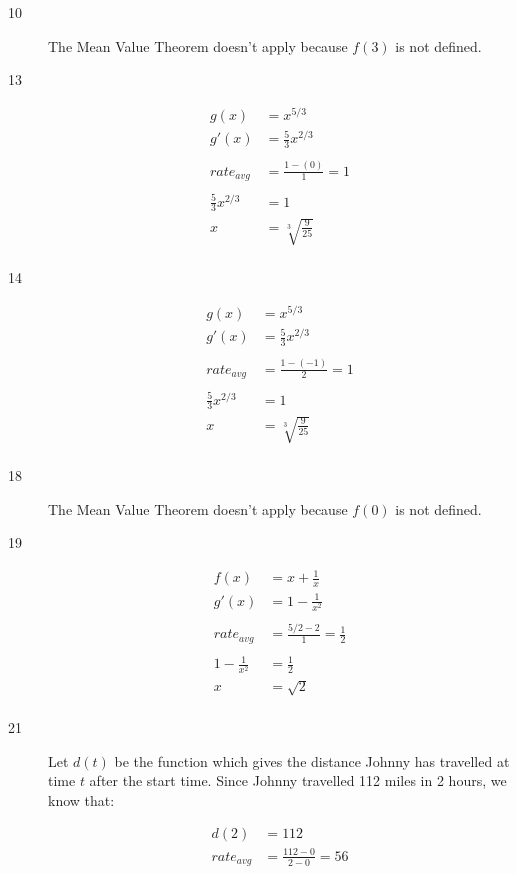 \documentclass[fleqn]{exam}
\begin{document}
\begin{description}
\item[10]
The Mean Value Theorem doesn't apply because $f(3)$ is not defined.

\item[13]
\begin{align*}
  g(x) &= x^{5/3} \\
  g'(x) &= \frac{5}{3} x^{2/3} \\
\\
  rate_{avg} &= \frac{1 - (0)}{1} = 1 \\
\\
  \frac{5}{3} x^{2/3} &= 1 \\
  x &= \sqrt[3] { \frac{9}{25} } \\
\end{align*}
 
\item[14]
\begin{align*}
  g(x) &= x^{5/3} \\
  g'(x) &= \frac{5}{3} x^{2/3} \\
\\
  rate_{avg} &= \frac{1 - (-1)}{2} = 1 \\
\\
  \frac{5}{3} x^{2/3} &= 1 \\
  x &= \sqrt[3] { \frac{9}{25} } \\
\end{align*}

\item[18]
The Mean Value Theorem doesn't apply because $f(0)$ is not defined.

\item[19]
\begin{align*}
  f(x) &= x + \frac{1}{x} \\
  g'(x) &= 1 - \frac{1}{x^2} \\
\\
  rate_{avg} &= \frac{5/2 - 2}{1} = \frac{1}{2} \\
\\
  1 - \frac{1}{x^2} &= \frac{1}{2} \\
  x &= \sqrt{2} \\ 
\end{align*}

\item[21] Let $d(t)$ be the function which gives the distance Johnny has travelled at time $t$ after the start time.
  Since Johnny travelled 112 miles in 2 hours, we know that:

\begin{align*}
  d(2) &= 112 \\
  rate_{avg} &= \frac{112 - 0}{2 - 0} = 56 \\
\end{align*}
 

\end{description}
\end{document}
